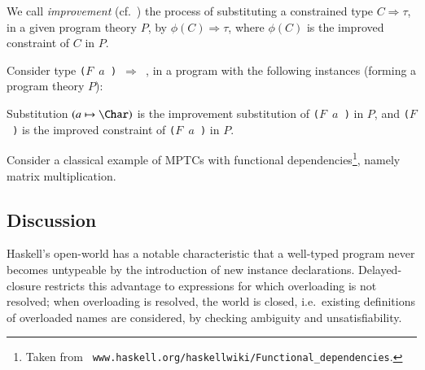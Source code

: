 \documentclass[review]{elsarticle}
\begin{document}
We call {\em improvement\/} (cf.~\cite{MarkJonesImprovement}) the
process of substituting a constrained type $C \Rightarrow \tau$, in a
given program theory $P$, by $\phi(C) \Rightarrow \tau$, where
$\phi(C)$ is the improved constraint of $C$ in $P$.

\begin{Example} Consider type {\tt ($F$ $a$ \Bool) $\Rightarrow$ \Bool},
in a program with the following instances (forming a program theory
$P$):

Substitution $(a\mapsto \Char)$ is the improvement substitution of
{\tt ($F$ $a$ \Bool)} in $P$, and {\tt ($F$ \Char\ \Bool)} is the
improved constraint of {\tt ($F$ $a$ \Bool)} in $P$.

\end{Example}

\begin{Example} Consider a classical example of MPTCs with functional
dependencies\footnote{Taken from {\small {\tt
      www.haskell.org/haskellwiki/Functional\_dependencies}}.}, namely
matrix multiplication.



\end{Example}

\subsection{Discussion}
\label{Discussion}

Haskell's open-world has a notable characteristic that a well-typed
program never becomes untypeable by the introduction of new instance
declarations. Delayed-closure restricts this advantage to expressions
for which overloading is not resolved; when overloading is resolved,
the world is closed, i.e.~existing definitions of overloaded names are
considered, by checking ambiguity and unsatisfiability.
\end{document}
